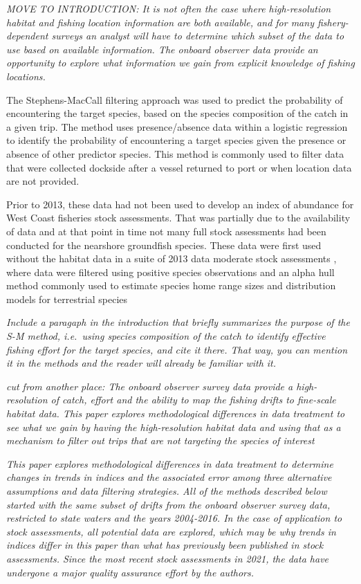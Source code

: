 \documentclass[
  12pt,
  authoryear,
  preprint,
  3p]{elsarticle}
\begin{document}
\emph{MOVE TO INTRODUCTION: It is not often the case where
high-resolution habitat and fishing location information are both
available, and for many fishery-dependent surveys an analyst will have
to determine which subset of the data to use based on available
information. The onboard observer data provide an opportunity to explore
what information we gain from explicit knowledge of fishing locations.}

The Stephens-MacCall \citeyearpar{Stephens:2004:MAS} filtering approach
was used to predict the probability of encountering the target species,
based on the species composition of the catch in a given trip. The
method uses presence/absence data within a logistic regression to
identify the probability of encountering a target species given the
presence or absence of other predictor species. This method is commonly
used to filter data that were collected dockside after a vessel returned
to port or when location data are not provided.

Prior to 2013, these data had not been used to develop an index of
abundance for West Coast fisheries stock assessments. That was partially
due to the availability of data and at that point in time not many full
stock assessments had been conducted for the nearshore groundfish
species. These data were first used without the habitat data in a suite
of 2013 data moderate stock assessments \citep{Cope:2015:DMS}, where
data were filtered using positive species observations and an alpha hull
method commonly used to estimate species home range sizes and
distribution models for terrestrial species
\citep{Burgman:2003:BSR, Meyer:2017:CHM}

\emph{Include a paragaph in the introduction that briefly summarizes the
purpose of the S-M method, i.e.~using species composition of the catch
to identify effective fishing effort for the target species, and cite it
there. That way, you can mention it in the methods and the reader will
already be familiar with it.}

\emph{cut from another place: The onboard observer survey data provide a
high-resolution of catch, effort and the ability to map the fishing
drifts to fine-scale habitat data. This paper explores methodological
differences in data treatment to see what we gain by having the
high-resolution habitat data and using that as a mechanism to filter out
trips that are not targeting the species of interest}

\emph{This paper explores methodological differences in data treatment
to determine changes in trends in indices and the associated error among
three alternative assumptions and data filtering strategies. All of the
methods described below started with the same subset of drifts from the
onboard observer survey data, restricted to state waters and the years
2004-2016. In the case of application to stock assessments, all
potential data are explored, which may be why trends in indices differ
in this paper than what has previously been published in stock
assessments. Since the most recent stock assessments in 2021, the data
have undergone a major quality assurance effort by the authors.}
\end{document}
